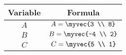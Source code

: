 \begin{center}
    \begin{tabular}{|c|c|} 
        \hline
            \textbf{Variable}  & \textbf{Formula} \\ 
        \hline
            $A$   & $A = \myvec{3 \\ 8}$ \\ 
        \hline
            $B$   &  $B = \myvec{-4 \\ 2}$\\ 
        \hline
          $C$   &  $C = \myvec{5 \\ 1}$\\ 
        \hline
           \end{tabular}
\end{center}  
